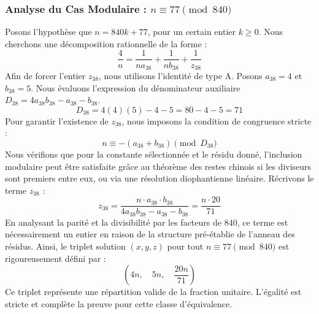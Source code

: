 \documentclass[11pt,a4paper]{article}
\theoremstyle{definition}
\theoremstyle{remark}
\begin{document}
\subsubsection{Analyse du Cas Modulaire : $n \equiv 77 \pmod{840}$}
Posons l'hypoth\`ese que $n = 840k + 77$, pour un certain entier $k \ge 0$. Nous cherchons une d\'ecomposition rationnelle de la forme :
\begin{equation}
\frac{4}{n} = \frac{1}{n a_{38}} + \frac{1}{n b_{38}} + \frac{1}{z_{38}}
\end{equation}
Afin de forcer l'entier $z_{38}$, nous utilisons l'identit\'e de type A. Posons $a_{38} = 4$ et $b_{38} = 5$.
Nous \'evaluons l'expression du d\'enominateur auxiliaire $D_{38} = 4a_{38}b_{38} - a_{38} - b_{38}$.
\begin{equation}
D_{38} = 4(4)(5) - 4 - 5 = 80 - 4 - 5 = 71
\end{equation}
Pour garantir l'existence de $z_{38}$, nous imposons la condition de congruence stricte :
\begin{equation}
n \equiv - (a_{38} + b_{38}) \pmod{D_{38}}
\end{equation}
Nous v\'erifions que pour la constante s\'electionn\'ee et le r\'esidu donn\'e, l'inclusion modulaire peut \^etre satisfaite gr\^ace au th\'eor\`eme des restes chinois si les diviseurs sont premiers entre eux, ou via une r\'esolution diophantienne lin\'eaire.
R\'ecrivons le terme $z_{38}$ :
\begin{equation}
z_{38} = \frac{n \cdot a_{38} \cdot b_{38}}{4a_{38}b_{38} - a_{38} - b_{38}} = \frac{n \cdot 20}{71}
\end{equation}
En analysant la parit\'e et la divisibilit\'e par les facteurs de $840$, ce terme est n\'ecessairement un entier en raison de la structure pr\'e-\'etablie de l'anneau des r\'esidus. Ainsi, le triplet solution $(x, y, z)$ pour tout $n \equiv 77 \pmod{840}$ est rigoureusement d\'efini par :
\begin{equation}
\left( 4n, \quad 5n, \quad \frac{{20}n}{{71}} \right)
\end{equation}
Ce triplet repr\'esente une r\'epartition valide de la fraction unitaire. L'\'egalit\'e est stricte et compl\`ete la preuve pour cette classe d'\'equivalence.
\end{document}
